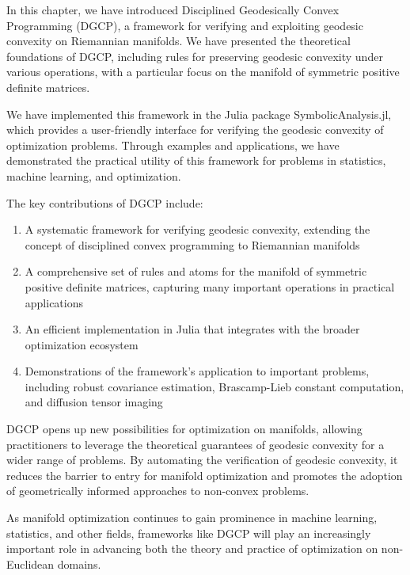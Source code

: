In this chapter, we have introduced Disciplined Geodesically Convex Programming (DGCP), a framework for verifying and exploiting geodesic convexity on Riemannian manifolds. We have presented the theoretical foundations of DGCP, including rules for preserving geodesic convexity under various operations, with a particular focus on the manifold of symmetric positive definite matrices.

We have implemented this framework in the Julia package SymbolicAnalysis.jl, which provides a user-friendly interface for verifying the geodesic convexity of optimization problems. Through examples and applications, we have demonstrated the practical utility of this framework for problems in statistics, machine learning, and optimization.

The key contributions of DGCP include:

\begin{enumerate}
\item A systematic framework for verifying geodesic convexity, extending the concept of disciplined convex programming to Riemannian manifolds
\item A comprehensive set of rules and atoms for the manifold of symmetric positive definite matrices, capturing many important operations in practical applications
\item An efficient implementation in Julia that integrates with the broader optimization ecosystem
\item Demonstrations of the framework's application to important problems, including robust covariance estimation, Brascamp-Lieb constant computation, and diffusion tensor imaging
\end{enumerate}

DGCP opens up new possibilities for optimization on manifolds, allowing practitioners to leverage the theoretical guarantees of geodesic convexity for a wider range of problems. By automating the verification of geodesic convexity, it reduces the barrier to entry for manifold optimization and promotes the adoption of geometrically informed approaches to non-convex problems.

As manifold optimization continues to gain prominence in machine learning, statistics, and other fields, frameworks like DGCP will play an increasingly important role in advancing both the theory and practice of optimization on non-Euclidean domains.